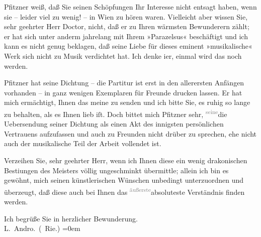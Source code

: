 \pstart
           Pfitzner weiß, daß Sie seinen Schöpfungen Ihr
               Interesse nicht entsagt haben, wenn sie – leider viel zu wenig! – in Wien zu hören waren. Vielleicht aber wissen Sie, sehr geehrter
               Herr Doctor, nicht, daß er zu Ihren wärmsten Bewunderern zählt; er hat sich unter
               anderm jahrelang mit Ihrem »Parazelsus«
               beschäftigt und ich kann es nicht genug beklagen, daß seine Liebe für dieses eminent
               »musikalische« Werk sich nicht zu Musik verdichtet hat. Ich denke i{\geminationm}er, einmal wird das noch werden.\pend
           
\pstart
           Pfitzner hat seine Dichtung – die Partitur ist erst in den
               allerersten Anfängen vorhanden – in ganz wenigen Exemplaren für Freunde drucken
               lassen. Er hat mich ermächtigt, Ihnen das meine zu senden und ich bitte Sie, es ruhig
               so lange zu behalten, als es Ihnen lieb iſt. Doch bittet mich Pfitzner sehr, \substVorne{}\textsuperscript{\textcolor{gray}{seine}}\substDazwischen{}die Ueber\substHinten{}sendung seiner Dichtung als einen Akt des innigsten persönlichen Vertrauens aufzufassen und
               auch zu Freunden nicht drüber zu sprechen, ehe nicht auch der musikalische Teil der
               Arbeit vollendet ist.\pend
           
\pstart
           Verzeihen Sie, sehr geehrter Herr, wenn ich Ihnen diese ein wenig drakonischen
                  Besti{\geminationm}ungen des Meisters völlig ungeschminkt übermittle; allein ich bin es
               gewöhnt, mich seinen künstlerischen Wünschen unbedingt unterzuordnen und überzeugt,
               daß diese auch bei Ihnen das {\pb}\substVorne{}\textsuperscript{\textcolor{gray}{äußerste}}\substDazwischen{}absoluteste\substHinten{} Verständnis finden werden.\pend
           
\pstart
           Ich begrüße Sie in herzlicher Bewunderung.{\\[\baselineskip]}\spacefill\mbox{L. Andro. (\label{K_L02569-1v}\label{K_L02569-1} Rie.)}\pend
           \leftskip=0em{}\endnumbering{}  
      